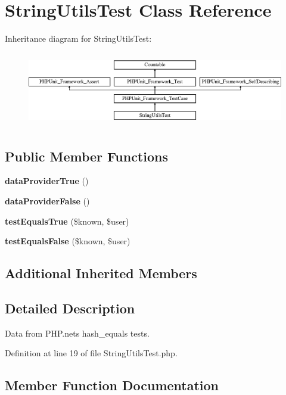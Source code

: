 \section{String\+Utils\+Test Class Reference}
\label{class_symfony_1_1_component_1_1_security_1_1_core_1_1_tests_1_1_util_1_1_string_utils_test}
Inheritance diagram for String\+Utils\+Test\+:\begin{figure}[H]
\begin{center}
\leavevmode
\includegraphics[height=3.303835cm]{class_symfony_1_1_component_1_1_security_1_1_core_1_1_tests_1_1_util_1_1_string_utils_test}
\end{center}
\end{figure}
\subsection*{Public Member Functions}
\begin{DoxyCompactItemize}
\item 
{\bf data\+Provider\+True} ()
\item 
{\bf data\+Provider\+False} ()
\item 
{\bf test\+Equals\+True} (\$known, \$user)
\item 
{\bf test\+Equals\+False} (\$known, \$user)
\end{DoxyCompactItemize}
\subsection*{Additional Inherited Members}


\subsection{Detailed Description}
Data from P\+H\+P.\+net\textquotesingle{}s hash\+\_\+equals tests. 

Definition at line 19 of file String\+Utils\+Test.\+php.



\subsection{Member Function Documentation}
